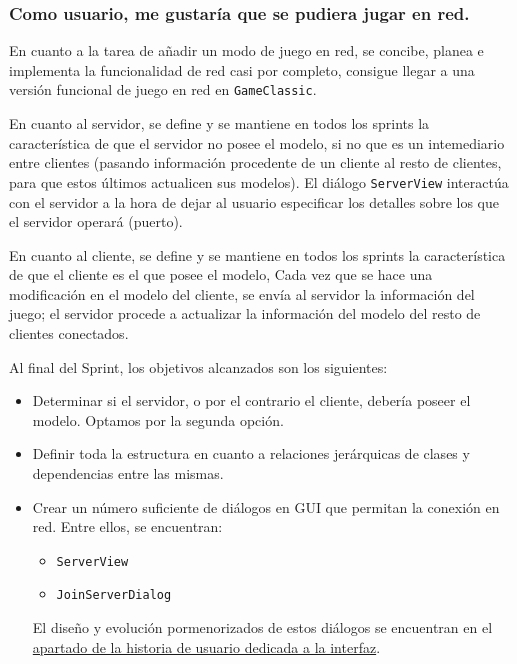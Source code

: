 \documentclass[../DocumentoOficial.tex]{subfiles}
\begin{document}
\newpage

\subsubsection{Como usuario, me gustaría que se pudiera jugar en red.}
\begin{sprint}[5]
En cuanto a la tarea de añadir un modo de juego en red, se concibe, planea e implementa la funcionalidad de red casi por completo, consigue llegar a una versión funcional de juego en red en \texttt{GameClassic}.

En cuanto al servidor, se define y se mantiene en todos los sprints la característica de que el servidor no posee el modelo, si no que es un intemediario entre clientes (pasando información procedente de un cliente al resto de clientes, para que estos últimos actualicen sus modelos). El diálogo \texttt{ServerView} interactúa con el servidor a la hora de dejar al usuario especificar los detalles sobre los que el servidor operará (puerto).

En cuanto al cliente, se define y se mantiene en todos los sprints la característica de que el cliente es el que posee el modelo, Cada vez que se hace una modificación en el modelo del cliente, se envía al servidor la información del juego; el servidor procede a actualizar la información del modelo del resto de clientes conectados.

Al final del Sprint, los objetivos alcanzados son los siguientes:

\begin{itemize}
\item Determinar si el servidor, o por el contrario el cliente, debería poseer el modelo. Optamos por la segunda opción.

\item Definir toda la estructura en cuanto a relaciones jerárquicas de clases y dependencias entre las mismas.

\item Crear un número suficiente de diálogos en GUI que permitan la conexión en red. Entre ellos, se encuentran:
\begin{itemize}
\item \texttt{ServerView}
\item \texttt{JoinServerDialog}
\end{itemize}

El diseño y evolución pormenorizados de estos diálogos se encuentran en el \hyperref[subsec:GUIView]{apartado de la historia de usuario dedicada a la interfaz}.


\end{itemize}
\end{sprint}
\end{document}
